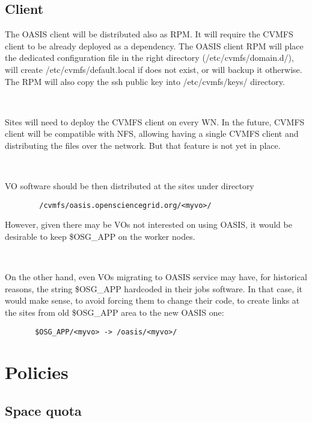 \documentclass{article}
\begin{document}
\subsection{Client}

The OASIS client will be distributed also as RPM. 
It will require the CVMFS client to be already deployed as a dependency. 
The OASIS client RPM will place the dedicated configuration file in the right directory 
(/etc/cvmfs/domain.d/),
will create /etc/cvmfs/default.local if does not exist,
or will backup it otherwise.
The RPM will also copy the ssh public key into /etc/cvmfs/keys/ directory.

~

Sites will need to deploy the CVMFS client on every WN. 
In the future, CVMFS client will be compatible with NFS, 
allowing having a single CVMFS client and distributing the files over the network.
But that feature is not yet in place. 

~

VO software should be then distributed at the sites under directory 

\begin{verbatim}
        /cvmfs/oasis.opensciencegrid.org/<myvo>/ 
\end{verbatim}

However, given there may be VOs not interested on using OASIS, 
it would be desirable to keep \$OSG\_APP on the worker nodes. 

~

On the other hand, even VOs migrating to OASIS service may have, 
for historical reasons, 
the string \$OSG\_APP hardcoded in their jobs software. 
In that case, it would make sense, to avoid forcing them to change their code, 
to create links at the sites from old \$OSG\_APP area to the new OASIS one:

\begin{verbatim}
       $OSG_APP/<myvo> -> /oasis/<myvo>/ 
\end{verbatim}

\section{Policies}

\subsection{Space quota}
\end{document}
